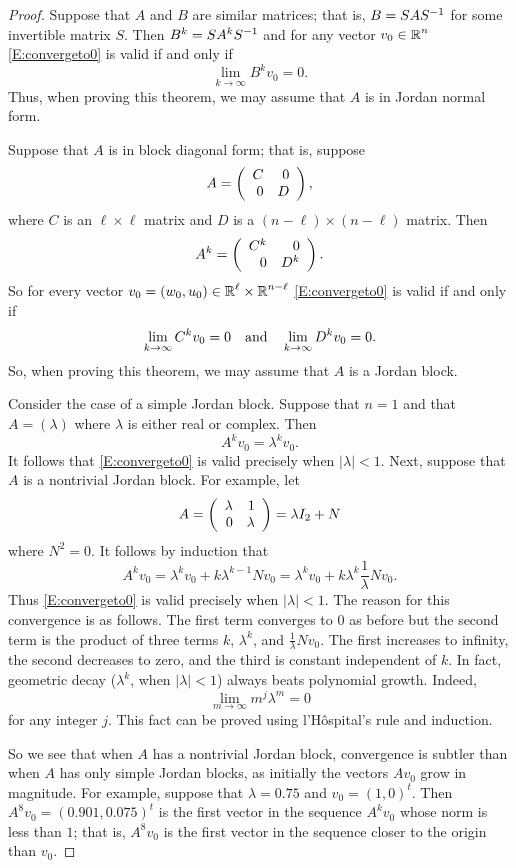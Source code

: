 \documentclass{ximera}
\begin{document}
\begin{proof}  Suppose that $A$ and $B$ are similar matrices; that is, $B=SAS^{-1}$
for some invertible matrix $S$.  Then $B^k = SA^kS^{-1}$ and for any vector 
$v_0\in\mbox{$\Bbb{R}$}^n$ \eqref{E:convergeto0} is valid if and only if
\[
\lim_{k\to\infty} B^kv_0 = 0.
\]
Thus, when proving this theorem, we may assume that $A$ is in Jordan normal
form.

Suppose that $A$ is in block diagonal form; that is, suppose
\[
A=\left(\begin{array}{rr} C & 0\\ 0 &D\end{array}\right),
\]
where $C$ is an $\ell\times\ell$ matrix and $D$ is a $(n-\ell)\times (n-\ell)$
matrix.  Then 
\[
A^k = \left(\begin{array}{rr} C^k & 0\\ 0 &D^k\end{array}\right).
\]
So for every vector $v_0=(w_0,u_0)\in\mbox{$\Bbb{R}$}^\ell\times\mbox{$\Bbb{R}$}^{n-\ell}$ 
\eqref{E:convergeto0} is valid if and only if 
\[
\lim_{k\to\infty} C^kv_0 = 0 \quad\mbox{and}\quad \lim_{k\to\infty} D^kv_0 = 0.
\]
So, when proving this theorem, we may assume that $A$ is a Jordan block.

Consider the case of a simple Jordan block.  
Suppose that $n=1$ and that 
$A=(\lambda)$ where $\lambda$ is either real or complex.  Then 
\[
A^kv_0 = \lambda^kv_0.
\]
It follows that \eqref{E:convergeto0} is valid precisely when $|\lambda|<1$.  
Next, suppose that $A$ is a nontrivial Jordan block.  For example, let 
\[
A=\left(\begin{array}{rr} \lambda & 1\\ 0 &\lambda\end{array}\right) = \lambda I_2+N
\]
where $N^2=0$.  It follows by induction that 
\[
A^kv_0 = \lambda^kv_0 + k\lambda^{k-1}Nv_0 = \lambda^kv_0 + 
k\lambda^k\frac{1}{\lambda}Nv_0.
\]
Thus \eqref{E:convergeto0} is valid precisely when $|\lambda|<1$.  The reason for this convergence is as follows.  The first term converges to $0$ as 
before but the second term is the product of three terms $k$, $\lambda^k$,
and $\frac{1}{\lambda}Nv_0$.  The first increases to infinity, the second
decreases to zero, and the third is constant independent of $k$.  In fact,
geometric decay 
($\lambda^k$, when $|\lambda|<1$) always beats 
polynomial growth.  Indeed,
\begin{equation}  \label{E:PG}
\lim_{m\to\infty}m^j\lambda^m = 0
\end{equation}
for any integer $j$.  This fact can be proved using l'H\^{o}spital's rule 
and induction.

So we see that when $A$ has a nontrivial Jordan block, convergence is 
subtler than when $A$ has only simple Jordan blocks, as initially the 
vectors $Av_0$ grow in magnitude.  For example, suppose that $\lambda=0.75$ 
and $v_0=(1,0)^t$.  Then $A^8v_0 = (0.901,0.075)^t$ is the first vector in 
the sequence $A^kv_0$ whose norm is less than $1$; that is, $A^8v_0$ is the 
first vector in the sequence closer to the origin than $v_0$.  


\end{proof}
\end{document}
